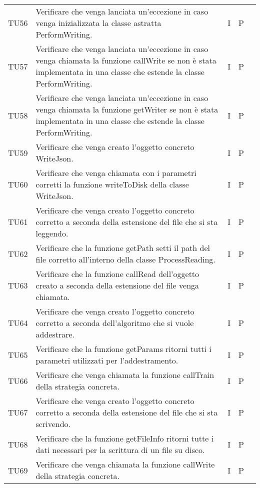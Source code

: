 \begin{longtable} {
		>{}p{15mm} 
		>{}p{79.5mm}
		>{}p{15mm} 
		>{}p{15mm}
		>{}p{0mm}}
	TU56		& Verificare che venga lanciata un'eccezione in caso venga inizializzata la classe astratta  PerformWriting.& I & P &\TBstrut \\ [2mm]
	TU57		& Verificare che venga lanciata un'eccezione in caso venga chiamata la funzione callWrite se non è stata implementata in una classe che estende la classe PerformWriting.& I & P &\TBstrut \\ [2mm]
	TU58		& Verificare che venga lanciata un'eccezione in caso venga chiamata la funzione getWriter se non è stata implementata in una classe che estende la classe PerformWriting.& I & P &\TBstrut \\ [2mm]
	TU59		& Verificare che venga creato l'oggetto concreto WriteJson.& I & P &\TBstrut \\ [2mm]
	TU60		& Verificare che venga chiamata con i parametri corretti la funzione writeToDisk della classe WriteJson.& I & P &\TBstrut \\ [2mm]
	TU61		& Verificare che venga creato l'oggetto concreto corretto a seconda della estensione del file che si sta leggendo.& I & P &\TBstrut \\ [2mm]
	TU62		& Verificare che la funzione getPath setti il path del file corretto all'interno della classe ProcessReading.& I & P &\TBstrut \\ [2mm]
	TU63		& Verificare che la funzione callRead dell'oggetto creato a seconda della estensione del file venga chiamata.& I & P &\TBstrut \\ [2mm]
	TU64		& Verificare che venga creato l'oggetto concreto corretto a seconda dell'algoritmo che si vuole addestrare.& I & P &\TBstrut \\ [2mm]
	TU65     	& Verificare che la funzione getParams ritorni tutti i parametri utilizzati per l'addestramento.& I & P &\TBstrut \\ [2mm]
	TU66		& Verificare che venga chiamata la funzione callTrain della strategia concreta.& I & P &\TBstrut \\ [2mm]
	TU67		& Verificare che venga creato l'oggetto concreto corretto a seconda della estensione del file che si sta scrivendo.& I & P &\TBstrut \\ [2mm]
	TU68		& Verificare che la funzione getFileInfo ritorni tutte i dati necessari per la scrittura di un file su disco.& I & P &\TBstrut \\ [2mm]
	TU69		& Verificare che venga chiamata la funzione callWrite della strategia concreta.& I & P &\TBstrut \\ [2mm]

\end{longtable}
